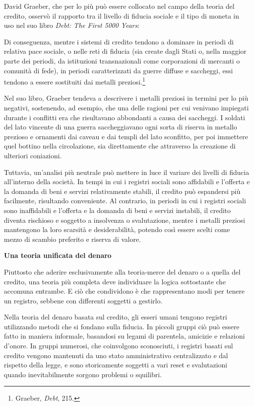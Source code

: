 \documentclass[
  a5paper,
  smalldemyvopaper,10pt,twoside,onecolumn,openright,extrafontsizes,hidelinks]{memoir}
\renewenvironment{quote}%
               {\list{}{\rightmargin=.6cm\leftmargin=.6cm}%
                \itshape \item[]}%
               {\endlist}
\begin{document}
David Graeber, che per lo più può essere collocato nel campo della
teoria del credito, osservò il rapporto tra il livello di fiducia
sociale e il tipo di moneta in uso nel suo libro \emph{Debt: The First
5000 Years}:

\begin{quote}
Di conseguenza, mentre i sistemi di credito tendono a dominare in
periodi di relativa pace sociale, o nelle reti di fiducia (sia create
dagli Stati o, nella maggior parte dei periodi, da istituzioni
transnazionali come corporazioni di mercanti o comunità di fede), in
periodi caratterizzati da guerre diffuse e saccheggi, essi tendono a
essere sostituiti dai metalli preziosi.\footnote{Graeber, \emph{Debt},
  215.}
\end{quote}

Nel suo libro, Graeber tendeva a descrivere i metalli preziosi in
termini per lo più negativi, sostenendo, ad esempio, che una delle
ragioni per cui venivano impiegati durante i conflitti era che
risultavano abbondanti a causa dei saccheggi. I soldati del lato
vincente di una guerra saccheggiavano ogni sorta di riserva in metallo
prezioso e ornamenti dai caveau e dai templi del lato sconfitto, per poi
immettere quel bottino nella circolazione, sia direttamente che
attraverso la creazione di ulteriori coniazioni.

Tuttavia, un'analisi più neutrale può mettere in luce il variare dei
livelli di fiducia all'interno della società. In tempi in cui i registri
sociali sono affidabili e l'offerta e la domanda di beni e servizi
relativamente stabili, il credito può espandersi più facilmente,
risultando conveniente. Al contrario, in periodi in cui i registri
sociali sono inaffidabili e l'offerta e la domanda di beni e servizi
instabili, il credito diventa rischioso e soggetto a insolvenza o
svalutazione, mentre i metalli preziosi mantengono la loro scarsità e
desiderabilità, potendo così essere scelti come mezzo di scambio
preferito e riserva di valore.

\textbf{Una teoria unificata del denaro}

Piuttosto che aderire esclusivamente alla teoria-merce del denaro o a
quella del credito, una teoria più completa deve individuare la logica
sottostante che accomuna entrambe. E ciò che condividono è che
rappresentano modi per tenere un registro, sebbene con differenti
soggetti a gestirlo.

Nella teoria del denaro basata sul credito, gli esseri umani tengono
registri utilizzando metodi che si fondano sulla fiducia. In piccoli
gruppi ciò può essere fatto in maniera informale, basandosi su legami di
parentela, amicizie e relazioni d'onore. In gruppi numerosi, che
coinvolgono sconosciuti, i registri basati sul credito vengono mantenuti
da uno stato amministrativo centralizzato e dal rispetto della legge, e
sono storicamente soggetti a vari reset e svalutazioni quando
inevitabilmente sorgono problemi o squilibri.
\end{document}
